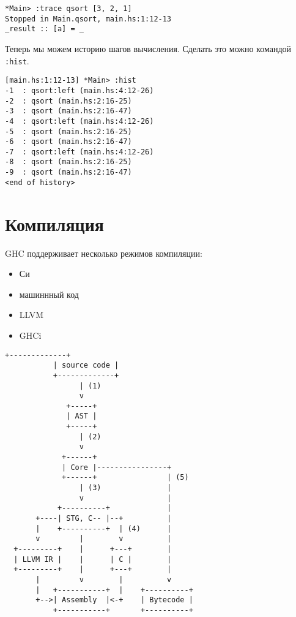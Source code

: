 \documentclass[14pt]{extarticle}
\def\code#1{\texttt{#1}}
\begin{document}
\begin{lstlisting}
*Main> :trace qsort [3, 2, 1]
Stopped in Main.qsort, main.hs:1:12-13
_result :: [a] = _
\end{lstlisting}

Теперь мы можем историю шагов вычисления. Сделать это можно командой \code{:hist}.

\begin{lstlisting}
[main.hs:1:12-13] *Main> :hist
-1  : qsort:left (main.hs:4:12-26)
-2  : qsort (main.hs:2:16-25)
-3  : qsort (main.hs:2:16-47)
-4  : qsort:left (main.hs:4:12-26)
-5  : qsort (main.hs:2:16-25)
-6  : qsort (main.hs:2:16-47)
-7  : qsort:left (main.hs:4:12-26)
-8  : qsort (main.hs:2:16-25)
-9  : qsort (main.hs:2:16-47)
<end of history> 
\end{lstlisting}

\section{Компиляция}

GHC поддерживает несколько режимов компиляции:

\begin{itemize}
\item Си
\item машиннный код
\item LLVM 
\item GHCi
\end{itemize}

\begin{lstlisting}[float, floatplacement=H, label={lst:compilation},
caption=Схема процесса компиляции]
           +-------------+
           | source code |
           +-------------+
                 | (1)
                 v
              +-----+
              | AST |
              +-----+
                 | (2)
                 v
             +------+
             | Core |----------------+
             +------+                | (5)
                 | (3)               |
                 v                   |
            +----------+             |
       +----| STG, C-- |--+          |
       |    +----------+  | (4)      |
       v         |        v          |
  +---------+    |      +---+        |
  | LLVM IR |    |      | C |        |
  +---------+    |      +---+        |
       |         v        |          v
       |   +-----------+  |    +----------+
       +-->| Assembly  |<-+    | Bytecode |
           +-----------+       +----------+
\end{lstlisting}
\end{document}
